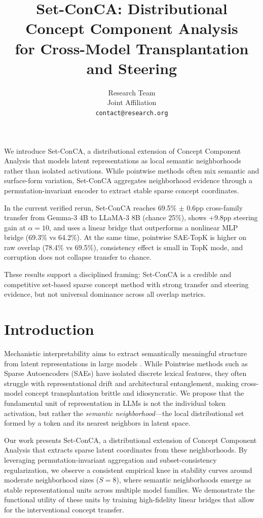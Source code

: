 \documentclass{article}
\title{Set-ConCA: Distributional Concept Component Analysis\\for Cross-Model Transplantation and Steering}
\author{
  Research Team \\
  Joint Affiliation \\
  \texttt{contact@research.org}
}
\begin{document}
\maketitle

We introduce Set-ConCA, a distributional extension of Concept Component Analysis that models latent representations as local semantic neighborhoods rather than isolated activations. While pointwise methods often mix semantic and surface-form variation, Set-ConCA aggregates neighborhood evidence through a permutation-invariant encoder to extract stable sparse concept coordinates.

In the current verified rerun, Set-ConCA reaches 69.5\% $\pm$ 0.6pp cross-family transfer from Gemma-3 4B to LLaMA-3 8B (chance 25\%), shows +9.8pp steering gain at $\alpha=10$, and uses a linear bridge that outperforms a nonlinear MLP bridge (69.3\% vs 64.2\%). At the same time, pointwise SAE-TopK is higher on raw overlap (78.4\% vs 69.5\%), consistency effect is small in TopK mode, and corruption does not collapse transfer to chance.

These results support a disciplined framing: Set-ConCA is a credible and competitive set-based sparse concept method with strong transfer and steering evidence, but not universal dominance across all overlap metrics.

\section{Introduction}
Mechanistic interpretability aims to extract semantically meaningful structure from latent representations in large models \citep{bricken2023monosemanticity,elhage2022superposition,zou2023transparency}. While Pointwise methods such as Sparse Autoencoders (SAEs) have isolated discrete lexical features, they often struggle with representational drift and architectural entanglement, making cross-model concept transplantation brittle and idiosyncratic. We propose that the fundamental unit of representation in LLMs is not the individual token activation, but rather the \textit{semantic neighborhood}---the local distributional set formed by a token and its nearest neighbors in latent space.

Our work presents Set-ConCA, a distributional extension of Concept Component Analysis that extracts sparse latent coordinates from these neighborhoods. By leveraging permutation-invariant aggregation and subset-consistency regularization, we observe a consistent empirical knee in stability curves around moderate neighborhood sizes ($S=8$), where semantic neighborhoods emerge as stable representational units across multiple model families. We demonstrate the functional utility of these units by training high-fidelity linear bridges that allow for the interventional concept transfer.
\end{document}
